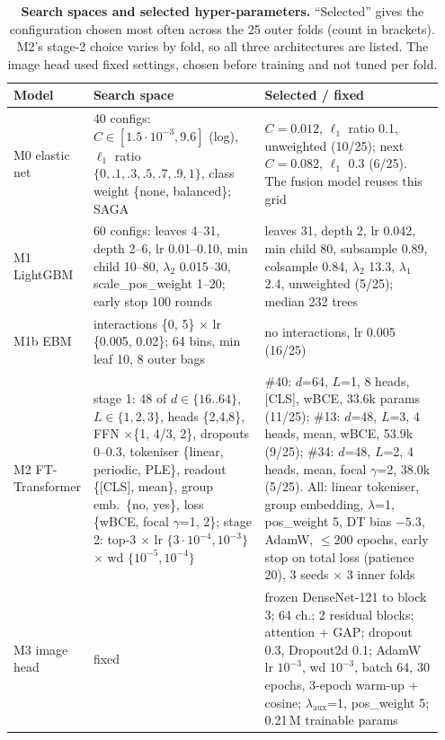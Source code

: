 \begin{table}[!tbp]
  \centering
  \caption{\textbf{Search spaces and selected hyper-parameters.} ``Selected'' gives the configuration chosen most often
  across the 25 outer folds (count in brackets). M2's stage-2 choice varies by fold, so all three architectures are
  listed. The image head used fixed settings, chosen before training and not tuned per fold.}
  \label{tab:hparams}
  \small
  \setlength{\tabcolsep}{4pt}
  \begin{tabular}{@{}R{0.13\linewidth}R{0.40\linewidth}R{0.42\linewidth}@{}}
    \toprule
    Model & Search space & Selected / fixed \\
    \midrule
    M0 elastic net & 40 configs: $C\in[1.5\cdot10^{-3},9.6]$ (log), $\ell_1$ ratio $\{0,.1,.3,.5,.7,.9,1\}$, class
      weight \{none, balanced\}; SAGA & $C=0.012$, $\ell_1$ ratio 0.1, unweighted (10/25); next $C=0.082$, $\ell_1$ 0.3
      (6/25). The fusion model reuses this grid \\
    M1 LightGBM & 60 configs: leaves 4--31, depth 2--6, lr 0.01--0.10, min child 10--80, $\lambda_2$ 0.015--30,
      scale\_pos\_weight 1--20; early stop 100 rounds & leaves 31, depth 2, lr 0.042, min child 80, subsample 0.89,
      colsample 0.84, $\lambda_2$ 13.3, $\lambda_1$ 2.4, unweighted (5/25); median 232 trees \\
    M1b EBM & interactions \{0, 5\} $\times$ lr \{0.005, 0.02\}; 64 bins, min leaf 10, 8 outer bags & no interactions,
      lr 0.005 (16/25) \\
    M2 FT-Transformer & stage 1: 48 of $d\in\{16..64\}$, $L\in\{1,2,3\}$, heads \{2,4,8\}, FFN $\times$\{1, 4/3, 2\},
      dropouts 0--0.3, tokeniser \{linear, periodic, PLE\}, readout \{[CLS], mean\}, group emb.\ \{no, yes\}, loss
      \{wBCE, focal $\gamma$=1, 2\}; stage 2: top-3 $\times$ lr $\{3\!\cdot\!10^{-4},10^{-3}\}$ $\times$ wd
      $\{10^{-5},10^{-4}\}$ & \#40: $d$=64, $L$=1, 8 heads, [CLS], wBCE, 33.6k params (11/25); \#13: $d$=48, $L$=3, 4
      heads, mean, wBCE, 53.9k (9/25); \#34: $d$=48, $L$=2, 4 heads, mean, focal $\gamma$=2, 38.0k (5/25). All: linear
      tokeniser, group embedding, $\lambda$=1, pos\_weight 5, DT bias $-5.3$, AdamW, $\le$200 epochs, early stop on total
      loss (patience 20), 3 seeds $\times$ 3 inner folds \\
    M3 image head & fixed & frozen DenseNet-121 to block 3; 64 ch.; 2 residual blocks; attention + GAP; dropout 0.3,
      Dropout2d 0.1; AdamW lr $10^{-3}$, wd $10^{-3}$, batch 64, 30 epochs, 3-epoch warm-up + cosine; $\lambda_{\text{aux}}$=1,
      pos\_weight 5; 0.21\,M trainable params \\
    \bottomrule
  \end{tabular}
\end{table}
